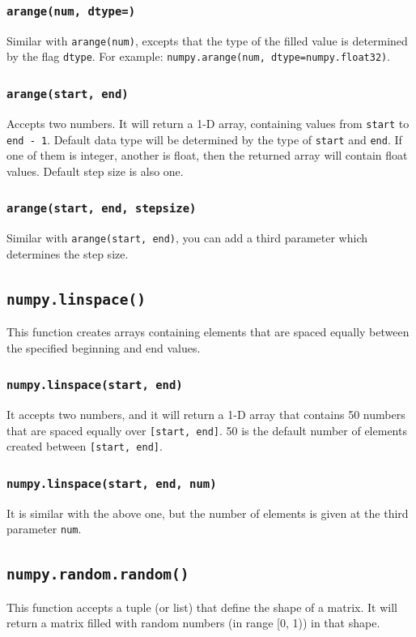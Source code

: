 \documentclass[12pt]{book}
\begin{document}
\subsubsection{\texttt{arange(num, dtype=)}}
\label{sec:orgd74ae20}
Similar with \texttt{arange(num)}, excepts that the type of the filled value is determined by the flag \texttt{dtype}. For example: \texttt{numpy.arange(num, dtype=numpy.float32)}.
\subsubsection{\texttt{arange(start, end)}}
\label{sec:org8bc934b}
Accepts two numbers. It will return a 1-D array, containing values from \texttt{start} to \texttt{end - 1}. Default data type will be determined by the type of \texttt{start} and \texttt{end}. If one of them is integer, another is float, then the returned array will contain float values. Default step size is also one.
\subsubsection{\texttt{arange(start, end, stepsize)}}
\label{sec:orgc62e2ba}
Similar with \texttt{arange(start, end)}, you can add a third parameter which determines the step size.
\subsection{\texttt{numpy.linspace()}}
\label{sec:org6e11364}
This function creates arrays containing elements that are spaced equally between the specified beginning and end values.
\subsubsection{\texttt{numpy.linspace(start, end)}}
\label{sec:orgf42b4f9}
It accepts two numbers, and it will return a 1-D array that contains 50 numbers that are spaced equally over \texttt{[start, end]}. 50 is the default number of elements created between \texttt{[start, end]}.
\subsubsection{\texttt{numpy.linspace(start, end, num)}}
\label{sec:org0ad9c1d}
It is similar with the above one, but the number of elements is given at the third parameter \texttt{num}.
\subsection{\texttt{numpy.random.random()}}
\label{sec:orgbb0c25f}
This function accepts a tuple (or list) that define the shape of a matrix. It will return a matrix filled with random numbers (in range [0, 1)) in that shape.
\end{document}

